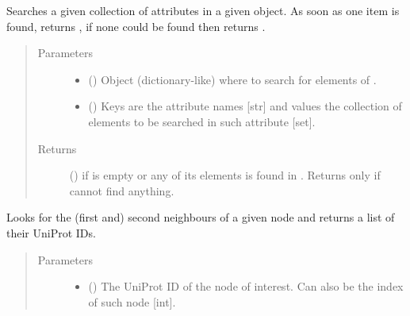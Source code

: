 \documentclass[letterpaper,10pt,english]{sphinxmanual}
\begin{document}
\begin{fulllineitems}
\begin{fulllineitems}
\label{\detokenize{reference:pypath.main.PyPath.search_attr_or}}
Searches a given collection of attributes in a given object. As
soon as one item is found, returns , if none could be
found then returns .
\begin{quote}\begin{description}
\item[{Parameters}] \leavevmode\begin{itemize}
\item {} 
 () \textendash{} Object (dictionary-like) where to search for elements of
.

\item {} 
 () \textendash{} Keys are the attribute names {[}str{]} and values the collection
of elements to be searched in such attribute {[}set{]}.

\end{itemize}

\item[{Returns}] \leavevmode
() \textendash{}  if  is empty or any of its
elements is found in . Returns only  if cannot
find anything.

\end{description}\end{quote}

\end{fulllineitems}


\begin{fulllineitems}
\label{\detokenize{reference:pypath.main.PyPath.second_neighbours}}
Looks for the (first and) second neighbours of a given node and
returns a list of their UniProt IDs.
\begin{quote}\begin{description}
\item[{Parameters}] \leavevmode\begin{itemize}
\item {} 
 () \textendash{} The UniProt ID of the node of interest. Can also be the
index of such node {[}int{]}.


\end{itemize}
\end{description}
\end{quote}
\end{fulllineitems}
\end{fulllineitems}
\end{document}

